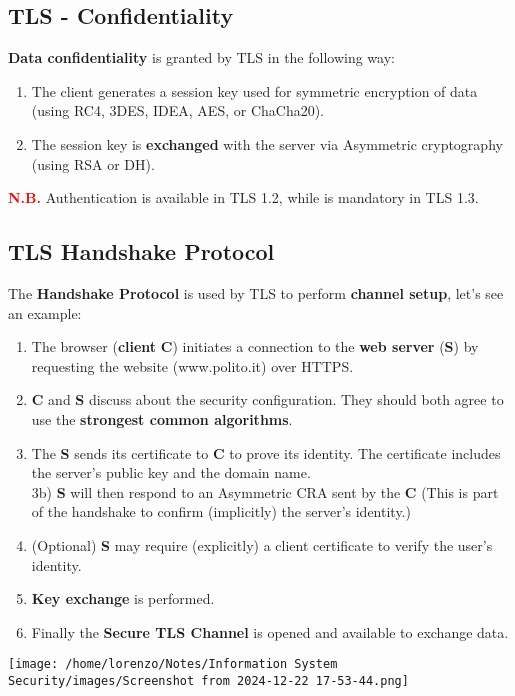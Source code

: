 \subsection{TLS - Confidentiality}
\textbf{Data confidentiality} is granted by TLS in the following way:
\begin{enumerate}
    \item The client generates a session key used for symmetric encryption of data (using RC4, 3DES, IDEA, AES, or ChaCha20). 
    \item The session key is \textbf{exchanged} with the server via Asymmetric cryptography (using RSA or DH).
\end{enumerate}
\textcolor{red}{\textbf{N.B.}} Authentication is available in TLS 1.2, while is mandatory in TLS 1.3. 

\subsection{TLS Handshake Protocol}
\begin{minipage}{0.6\textwidth}
    The \textbf{Handshake Protocol} is used by TLS to perform \textbf{channel setup}, let's see an example:
    \begin{enumerate}
        \item The browser (\textbf{client} \textbf{C}) initiates a connection to the \textbf{web server} (\textbf{S}) by requesting the website
        (www.polito.it) over HTTPS.
        \item \textbf{C} and \textbf{S} discuss about the security configuration. They should both agree to use the \textbf{strongest common algorithms}.
        \item The \textbf{S} sends its certificate to \textbf{C} to prove its identity. The certificate includes the server’s public key and the domain name.\\
        3b) \textbf{S} will then respond to an Asymmetric CRA sent by the \textbf{C} (This is part of the handshake to confirm (implicitly)
        the server’s identity.)
        \item (Optional) \textbf{S} may require (explicitly) a client certificate to verify
        the user’s identity.
        \item \textbf{Key exchange} is performed.
        \item Finally the \textbf{Secure TLS Channel} is opened and available to exchange data. 
    \end{enumerate}
\end{minipage} 
\hspace{0.1cm}
\begin{minipage}{0.5\textwidth}
    \texttt{[image: /home/lorenzo/Notes/Information System Security/images/Screenshot from 2024-12-22 17-53-44.png]}
\end{minipage}
